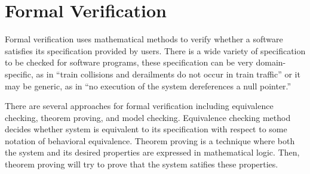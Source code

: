 \section*{Formal Verification} 

Formal verification uses mathematical methods to verify whether a software satisfies its specification provided by users. 
There is a wide variety of specification to be checked for software programs, these specification can be very domain-specific, as in “train collisions and derailments do not occur in train traffic” or it may be generic, as in “no execution of the system dereferences a null pointer.” 
%

There are several approaches for formal verification including equivalence checking, theorem proving, and model checking. Equivalence checking method decides whether system is equivalent to its specification with respect to some notation of behavioral equivalence. Theorem proving is a technique where both the system and its desired properties are expressed in mathematical logic. Then, theorem proving will try to prove that the system satifies these properties. 

